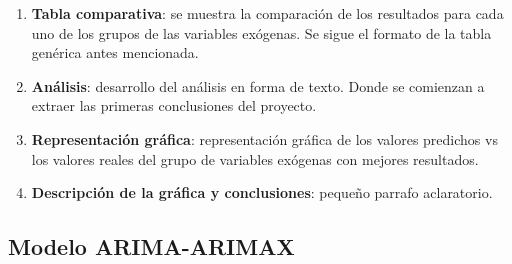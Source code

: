 \documentclass[12pt,a4paper]{report}
\begin{document}
\begin{enumerate}
    \item \textbf{Tabla comparativa}: se muestra la comparación de los resultados para cada uno de los grupos de las variables exógenas. Se sigue el formato de la tabla genérica antes mencionada.

    \item \textbf{Análisis}: desarrollo del análisis en forma de texto. Donde se comienzan a extraer las primeras conclusiones del proyecto.

    \item \textbf{Representación gráfica}: representación gráfica de los valores predichos vs los valores reales del grupo de variables exógenas con mejores resultados.

    \item \textbf{Descripción de la gráfica y conclusiones}: pequeño parrafo aclaratorio. 
\end{enumerate}

\subsection{Modelo ARIMA-ARIMAX}
\end{document}
